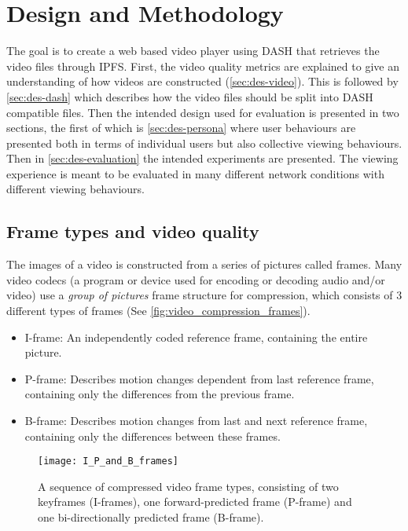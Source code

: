 \chapter{Design and Methodology}
\label{cha:design-and-method}

The goal is to create a web based video player using \ac{DASH} that retrieves the video files through \ac{IPFS}. First, the video quality metrics are explained to give an understanding of how videos are constructed (\autoref{sec:des-video}). This is followed by \autoref{sec:des-dash} which describes how the video files should be split into \ac{DASH} compatible files. Then the intended design used for evaluation is presented in two sections, the first of which is \autoref{sec:des-persona} where user behaviours are presented both in terms of individual users but also collective viewing behaviours. Then in \autoref{sec:des-evaluation} the intended experiments are presented. The viewing experience is meant to be evaluated in many different network conditions with different viewing behaviours.

\section{Frame types and video quality}
\label{sec:des-video}
The images of a video is constructed from a series of pictures called frames. Many video codecs (a program or device used for encoding or decoding audio and/or video) use a \emph{group of pictures} frame structure for compression, which consists of 3 different types of frames (See \autoref{fig:video_compression_frames}).

\begin{itemize}
    \item \ac{I-frame}: An independently coded reference frame, containing the entire picture.
    \item \ac{P-frame}: Describes motion changes dependent from last reference frame, containing only the differences from the previous frame.
    \item \ac{B-frame}: Describes motion changes from last and next reference frame, containing only the differences between these frames.
\end{itemize}

\begin{figure}
    \myfloatalign
    \texttt{[image: I\_P\_and\_B\_frames]}
    \caption[Frame types used in video compression]{A sequence of compressed video frame types, consisting of two keyframes (\acsp{I-frame}), one forward-predicted frame (\acs{P-frame}) and one bi-directionally predicted frame (\acs{B-frame}).}
    \label{fig:video_compression_frames}
\end{figure}

